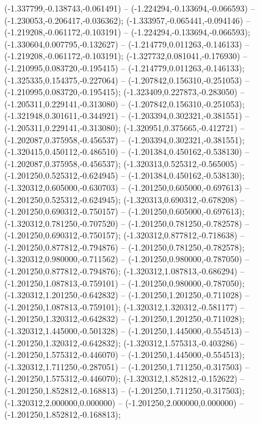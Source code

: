  (-1.337799,-0.138743,-0.061491) -- (-1.224294,-0.133694,-0.066593) -- (-1.230053,-0.206417,-0.036362);
 (-1.333957,-0.065441,-0.094146) -- (-1.219208,-0.061172,-0.103191) -- (-1.224294,-0.133694,-0.066593);
 (-1.330604,0.007795,-0.132627) -- (-1.214779,0.011263,-0.146133) -- (-1.219208,-0.061172,-0.103191);
 (-1.327732,0.081041,-0.176930) -- (-1.210995,0.083720,-0.195415) -- (-1.214779,0.011263,-0.146133);
 (-1.325335,0.154375,-0.227064) -- (-1.207842,0.156310,-0.251053) -- (-1.210995,0.083720,-0.195415);
 (-1.323409,0.227873,-0.283050) -- (-1.205311,0.229141,-0.313080) -- (-1.207842,0.156310,-0.251053);
 (-1.321948,0.301611,-0.344921) -- (-1.203394,0.302321,-0.381551) -- (-1.205311,0.229141,-0.313080);
 (-1.320951,0.375665,-0.412721) -- (-1.202087,0.375958,-0.456537) -- (-1.203394,0.302321,-0.381551);
 (-1.320415,0.450112,-0.486510) -- (-1.201384,0.450162,-0.538130) -- (-1.202087,0.375958,-0.456537);
 (-1.320313,0.525312,-0.565005) -- (-1.201250,0.525312,-0.624945) -- (-1.201384,0.450162,-0.538130);
 (-1.320312,0.605000,-0.630703) -- (-1.201250,0.605000,-0.697613) -- (-1.201250,0.525312,-0.624945);
 (-1.320313,0.690312,-0.678208) -- (-1.201250,0.690312,-0.750157) -- (-1.201250,0.605000,-0.697613);
 (-1.320312,0.781250,-0.707520) -- (-1.201250,0.781250,-0.782578) -- (-1.201250,0.690312,-0.750157);
 (-1.320312,0.877812,-0.718638) -- (-1.201250,0.877812,-0.794876) -- (-1.201250,0.781250,-0.782578);
 (-1.320312,0.980000,-0.711562) -- (-1.201250,0.980000,-0.787050) -- (-1.201250,0.877812,-0.794876);
 (-1.320312,1.087813,-0.686294) -- (-1.201250,1.087813,-0.759101) -- (-1.201250,0.980000,-0.787050);
 (-1.320312,1.201250,-0.642832) -- (-1.201250,1.201250,-0.711028) -- (-1.201250,1.087813,-0.759101);
 (-1.320312,1.320312,-0.581177) -- (-1.201250,1.320312,-0.642832) -- (-1.201250,1.201250,-0.711028);
 (-1.320312,1.445000,-0.501328) -- (-1.201250,1.445000,-0.554513) -- (-1.201250,1.320312,-0.642832);
 (-1.320312,1.575313,-0.403286) -- (-1.201250,1.575312,-0.446070) -- (-1.201250,1.445000,-0.554513);
 (-1.320312,1.711250,-0.287051) -- (-1.201250,1.711250,-0.317503) -- (-1.201250,1.575312,-0.446070);
 (-1.320312,1.852812,-0.152622) -- (-1.201250,1.852812,-0.168813) -- (-1.201250,1.711250,-0.317503);
 (-1.320312,2.000000,0.000000) -- (-1.201250,2.000000,0.000000) -- (-1.201250,1.852812,-0.168813);

